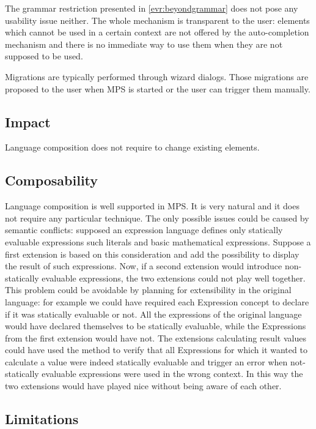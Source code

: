 \documentclass[preprint,numbers,10pt]{sigplanconf}
\begin{document}
The grammar restriction presented in \ref{evr:beyondgrammar} does not pose any usability issue neither. The whole mechanism is transparent to the user: elements which cannot be used in a certain context are not offered by the auto-completion mechanism and there is no immediate way to use them when they are not supposed to be used.

Migrations are typically performed through wizard dialogs. Those migrations are proposed to the user when MPS is started or the user can trigger them manually.

\subsection{Impact}

Language composition does not require to change existing elements.

\subsection{Composability}

Language composition is well supported in MPS. It is very natural and it does not require any particular technique. The only possible issues could be caused by semantic conflicts: supposed an expression language defines only statically evaluable expressions such literals and basic mathematical expressions. Suppose a first extension is based on this consideration and add the possibility to display the result of such expressions. Now, if a second extension would introduce non-statically evaluable expressions, the two extensions could not play well together. This problem could be avoidable by planning for extensibility in the original language: for example we could have required each Expression concept to declare if it was statically evaluable or not. All the expressions of the original language would have declared themselves to be statically evaluable, while the Expressions from the first extension would have not. The extensions calculating result values could have used the method to verify that all Expressions for which it wanted to calculate a value were indeed statically evaluable and trigger an error when not-statically evaluable expressions were used in the wrong context. In this way the two extensions would have played nice without being aware of each other.

\subsection{Limitations}
\end{document}
